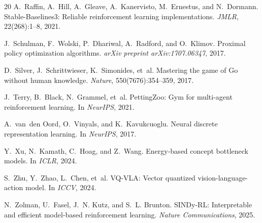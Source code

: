 \documentclass[11pt,a4paper]{article}
\begin{document}
\begin{thebibliography}{20}
A.~Raffin, A.~Hill, A.~Gleave, A.~Kanervisto, M.~Ernestus, and N.~Dormann.
\newblock Stable-Baselines3: Reliable reinforcement learning implementations.
\newblock \emph{JMLR}, 22(268):1--8, 2021.

J.~Schulman, F.~Wolski, P.~Dhariwal, A.~Radford, and O.~Klimov.
\newblock Proximal policy optimization algorithms.
\newblock \emph{arXiv preprint arXiv:1707.06347}, 2017.

D.~Silver, J.~Schrittwieser, K.~Simonides, et~al.
\newblock Mastering the game of Go without human knowledge.
\newblock \emph{Nature}, 550(7676):354--359, 2017.

J.~Terry, B.~Black, N.~Grammel, et~al.
\newblock PettingZoo: Gym for multi-agent reinforcement learning.
\newblock In \emph{NeurIPS}, 2021.

A.~van~den Oord, O.~Vinyals, and K.~Kavukcuoglu.
\newblock Neural discrete representation learning.
\newblock In \emph{NeurIPS}, 2017.

Y.~Xu, N.~Kamath, C.~Hoag, and Z.~Wang.
\newblock Energy-based concept bottleneck models.
\newblock In \emph{ICLR}, 2024.

S.~Zhu, Y.~Zhao, L.~Chen, et~al.
\newblock VQ-VLA: Vector quantized vision-language-action model.
\newblock In \emph{ICCV}, 2024.

N.~Zolman, U.~Fasel, J.~N. Kutz, and S.~L. Brunton.
\newblock SINDy-RL: Interpretable and efficient model-based reinforcement learning.
\newblock \emph{Nature Communications}, 2025.

\end{thebibliography}
\end{document}
